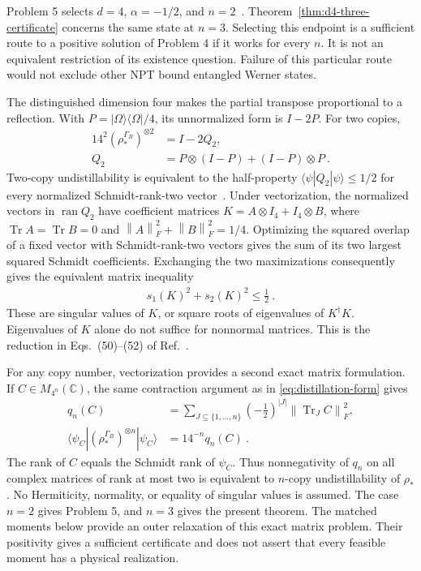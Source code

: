 \documentclass[aps,pra,reprint,superscriptaddress,amsmath,amssymb,floatfix,nofootinbib]{revtex4-2}
\newcommand{\Tr}{\operatorname{Tr}}
\newcommand{\ran}{\operatorname{ran}}
\newcommand{\norm}[1]{\left\lVert#1\right\rVert}
\newcommand{\C}{\mathbb C}
\begin{document}
Problem 5 selects $d=4$, $\alpha=-1/2$, and $n=2$~\cite{Five}.
Theorem~\ref{thm:d4-three-certificate} concerns the same state at $n=3$.
Selecting this endpoint is a sufficient route to a positive solution of
Problem 4 if it works for every $n$. It is not an equivalent restriction
of its existence question. Failure of this particular route would not
exclude other NPT bound entangled Werner states.

The distinguished dimension four makes the partial transpose proportional
to a reflection. With $P=|\Omega\rangle\langle\Omega|/4$, its
unnormalized form is $I-2P$. For two copies,
\begin{align}
 14^2(\rho_*^{\Gamma_B})^{\otimes2}&=I-2Q_2,\nonumber\\
 Q_2&=P\otimes(I-P)+(I-P)\otimes P\ .
 \label{eq:half-property-projector}
\end{align}
Two-copy undistillability is equivalent to the half-property
$\langle\psi|Q_2|\psi\rangle\leq1/2$ for every normalized
Schmidt-rank-two vector~\cite{PPHH}.
Under vectorization, the normalized vectors in $\ran Q_2$ have coefficient
matrices $K=A\otimes I_4+I_4\otimes B$, where
$\Tr A=\Tr B=0$ and $\norm A_F^2+\norm B_F^2=1/4$.
Optimizing the squared overlap of a fixed vector with Schmidt-rank-two
vectors gives the sum of its two largest squared Schmidt coefficients.
Exchanging the two maximizations consequently gives the equivalent
matrix inequality
\begin{align}
 s_1(K)^2+s_2(K)^2\leq\frac12\ .
 \label{eq:two-copy-singular-values}
\end{align}
These are singular values of $K$, or square roots of eigenvalues of
$K^\dagger K$. Eigenvalues of $K$ alone do not suffice for nonnormal
matrices. This is the reduction in Eqs.~(50)--(52) of Ref.~\cite{PPHH}.

For any copy number, vectorization provides a second exact matrix
formulation. If $C\in M_{4^n}(\C)$, the same contraction argument as in
\cref{eq:distillation-form} gives
\begin{align}
 q_n(C)&=\sum_{J\subseteq\{1,\ldots,n\}}
          \left(-\frac12\right)^{|J|}\norm{\Tr_J C}_F^2,\nonumber\\
 \langle\psi_C|(\rho_*^{\Gamma_B})^{\otimes n}|\psi_C\rangle
 &=14^{-n}q_n(C)\ .
 \label{eq:general-partial-trace-form}
\end{align}
The rank of $C$ equals the Schmidt rank of $\psi_C$. Thus nonnegativity
of $q_n$ on all complex matrices of rank at most two is equivalent to
$n$-copy undistillability of $\rho_*$. No Hermiticity, normality, or
equality of singular values is assumed. The case $n=2$ gives Problem 5,
and $n=3$ gives the present theorem. The matched moments below provide an
outer relaxation of this exact matrix problem. Their positivity gives
a sufficient certificate and does not assert that every feasible moment
has a physical realization.
\end{document}
